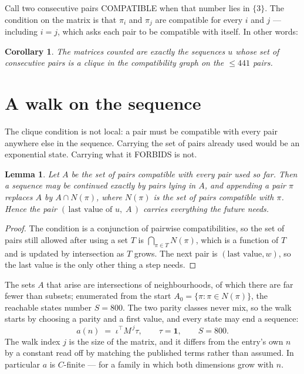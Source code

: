 \documentclass[11pt,a4paper]{article}
\theoremstyle{plain}
\newtheorem{lemma}[theorem]{Lemma}
\newtheorem{corollary}[theorem]{Corollary}
\theoremstyle{definition}
\begin{document}
Call two consecutive pairs COMPATIBLE when that number lies in $\{3\}$. The condition on the
matrix is that $\pi_i$ and $\pi_j$ are compatible for every $i$ and $j$ --- including $i=j$,
which asks each pair to be compatible with itself. In other words:

\begin{corollary}
The matrices counted are exactly the sequences $u$ whose set of consecutive pairs is a clique in
the compatibility graph on the $\le 441$ pairs.
\end{corollary}

\section{A walk on the sequence}

The clique condition is not local: a pair must be compatible with every pair anywhere else in
the sequence. Carrying the set of pairs already used would be an exponential state. Carrying
what it FORBIDS is not.

\begin{lemma}\label{lem:lump}
Let $A$ be the set of pairs compatible with every pair used so far. Then a sequence may be
continued exactly by pairs lying in $A$, and appending a pair $\pi$ replaces $A$ by
$A\cap N(\pi)$, where $N(\pi)$ is the set of pairs compatible with $\pi$. Hence the pair
$(\,\text{last value of }u,\;A\,)$ carries everything the future needs.
\end{lemma}

\begin{proof}
The condition is a conjunction of pairwise compatibilities, so the set of pairs still allowed
after using a set $T$ is $\bigcap_{\pi\in T}N(\pi)$, which is a function of $T$ and is updated
by intersection as $T$ grows. The next pair is $(\text{last value},w)$, so the last value is
the only other thing a step needs.
\end{proof}

The sets $A$ that arise are intersections of neighbourhoods, of which there are far fewer than
subsets; enumerated from the start $A_0=\{\pi:\pi\in N(\pi)\}$, the reachable states number
$S=800$. The two parity classes never mix, so the walk starts by choosing a parity and a first
value, and every state may end a sequence:
\[
a(n)\;=\;\iota^{\!\top}M^{\,j}\tau ,\qquad \tau=\mathbf{1},\qquad S=800.
\]
The walk index $j$ is the size of the matrix, and it differs from the entry's own $n$ by a
constant read off by matching the published terms rather than assumed. In particular $a$ is
$C$-finite --- for a family in which both dimensions grow with $n$.
\end{document}
